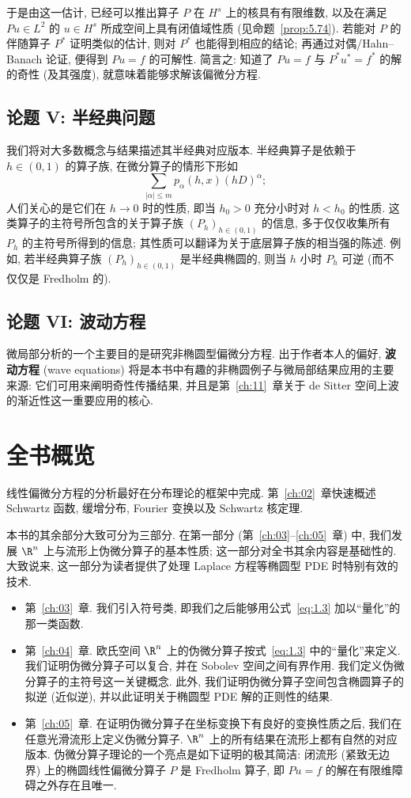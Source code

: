 于是由这一估计, 已经可以推出算子 $P$ 在 $H^s$ 上的核具有有限维数, 以及在满足 $P u \in L^2$ 的 $u \in H^s$ 所成空间上具有闭值域性质 (见命题~\ref{prop:5.74}). 若能对 $P$ 的伴随算子 $P^*$ 证明类似的估计, 则对 $P^*$ 也能得到相应的结论; 再通过对偶/Hahn--Banach 论证, 便得到 $P u = f$ 的可解性. 简言之: 知道了 $P u = f$ 与 $P^* u^* = f^*$ 的解的奇性 (及其强度), 就意味着能够求解该偏微分方程.

\subsection*{论题 V: 半经典问题}
我们将对大多数概念与结果描述其半经典对应版本. 半经典算子是依赖于 $h \in (0, 1)$ 的算子族, 在微分算子的情形下形如
\[
    \sum_{|\alpha| \le m} p_\alpha(h, x) (h D)^\alpha;
\]
人们关心的是它们在 $h \to 0$ 时的性质, 即当 $h_0 > 0$ 充分小时对 $h < h_0$ 的性质. 这类算子的主符号所包含的关于算子族 $(P_h)_{h \in (0, 1)}$ 的信息, 多于仅仅收集所有 $P_h$ 的主符号所得到的信息; 其性质可以翻译为关于底层算子族的相当强的陈述. 例如, 若半经典算子族 $(P_h)_{h \in (0, 1)}$ 是半经典椭圆的, 则当 $h$ 小时 $P_h$ 可逆 (而不仅仅是 Fredholm 的).

\subsection*{论题 VI: 波动方程}
微局部分析的一个主要目的是研究非椭圆型偏微分方程. 出于作者本人的偏好, \textbf{波动方程} (wave equations) 将是本书中有趣的非椭圆例子与微局部结果应用的主要来源: 它们可用来阐明奇性传播结果, 并且是第~\ref{ch:11}~章关于 de Sitter 空间上波的渐近性这一重要应用的核心.

\section{全书概览}\label{sec:1.3}

线性偏微分方程的分析最好在分布理论的框架中完成. 第~\ref{ch:02}~章快速概述 Schwartz 函数, 缓增分布, Fourier 变换以及 Schwartz 核定理.

本书的其余部分大致可分为三部分. 在第一部分 (第~\ref{ch:03}--\ref{ch:05}~章) 中, 我们发展 $\R^n$ 上与流形上伪微分算子的基本性质; 这一部分对全书其余内容是基础性的. 大致说来, 这一部分为读者提供了处理 Laplace 方程等椭圆型 PDE 时特别有效的技术.
\begin{itemize}[leftmargin=2em]
    \item 第~\ref{ch:03}~章. 我们引入符号类, 即我们之后能够用公式~\eqref{eq:1.3} 加以``量化''的那一类函数.
    \item 第~\ref{ch:04}~章. 欧氏空间 $\R^n$ 上的伪微分算子按式~\eqref{eq:1.3} 中的``量化''来定义. 我们证明伪微分算子可以复合, 并在 Sobolev 空间之间有界作用. 我们定义伪微分算子的主符号这一关键概念. 此外, 我们证明伪微分算子空间包含椭圆算子的拟逆 (近似逆), 并以此证明关于椭圆型 PDE 解的正则性的结果.
    \item 第~\ref{ch:05}~章. 在证明伪微分算子在坐标变换下有良好的变换性质之后, 我们在任意光滑流形上定义伪微分算子. $\R^n$ 上的所有结果在流形上都有自然的对应版本. 伪微分算子理论的一个亮点是如下证明的极其简洁: 闭流形 (紧致无边界) 上的椭圆线性偏微分算子 $P$ 是 Fredholm 算子, 即 $P u = f$ 的解在有限维障碍之外存在且唯一.
\end{itemize}

